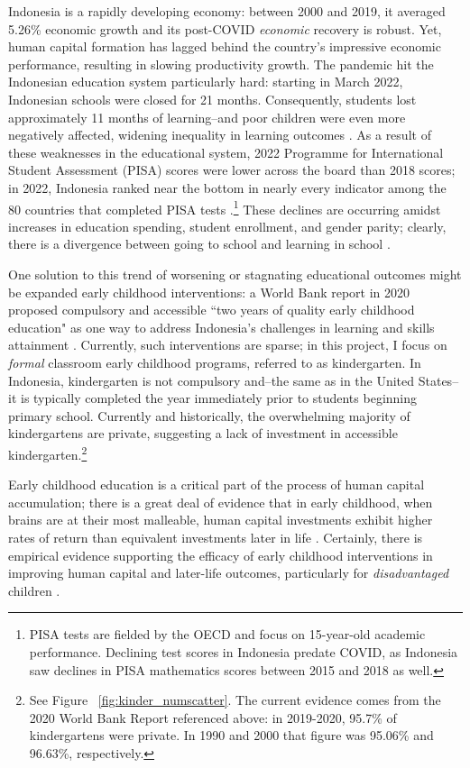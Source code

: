 Indonesia is a rapidly developing economy: between 2000 and 2019, it averaged 5.26\% economic growth and its post-COVID \textit{economic} recovery is robust. Yet, human capital formation has lagged behind the country's impressive economic performance, resulting in slowing productivity growth. The pandemic hit the Indonesian education system particularly hard: starting in March 2022, Indonesian schools were closed for 21 months. Consequently, students lost approximately 11 months of learning--and poor children were even more negatively affected, widening inequality in learning outcomes \citep{Bank2023}. As a result of these weaknesses in the educational system, 2022 Programme for International Student Assessment (PISA) scores were lower across the board than 2018 scores; in 2022, Indonesia ranked near the bottom in nearly every indicator among the 80 countries that completed PISA tests \citep{Wijaya2024}.\footnote{PISA tests are fielded by the OECD and focus on 15-year-old academic performance. Declining test scores in Indonesia predate COVID, as Indonesia saw declines in PISA mathematics scores between 2015 and 2018 as well.} These declines are occurring amidst increases in education spending, student enrollment, and gender parity; clearly, there is a divergence between going to school and learning in school \citep{Afkar2020}.

One solution to this trend of worsening or stagnating educational outcomes might be expanded early childhood interventions: a World Bank report in 2020 proposed compulsory and accessible ``two years of quality early childhood education" as one way to address Indonesia's challenges in learning and skills attainment \citep{Afkar2020}. Currently, such interventions are sparse; in this project, I focus on \textit{formal} classroom early childhood programs, referred to as kindergarten. In Indonesia, kindergarten is not compulsory and--the same as in the United States--it is typically completed the year immediately prior to students beginning primary school. Currently and historically, the overwhelming majority of kindergartens are private, suggesting a lack of investment in accessible kindergarten.\footnote{See Figure ~\ref{fig:kinder_numscatter}. The current evidence comes from the 2020 World Bank Report referenced above: in 2019-2020, 95.7\% of kindergartens were private. In 1990 and 2000 that figure was 95.06\% and 96.63\%, respectively.} 

Early childhood education is a critical part of the process of human capital accumulation; there is a great deal of evidence that in early childhood, when brains are at their most malleable, human capital investments exhibit higher rates of return than equivalent investments later in life \citep{Cantor2019}. Certainly, there is empirical evidence supporting the efficacy of early childhood interventions in improving human capital and later-life outcomes, particularly for \textit{disadvantaged} children \citep{Duncan2023}.

